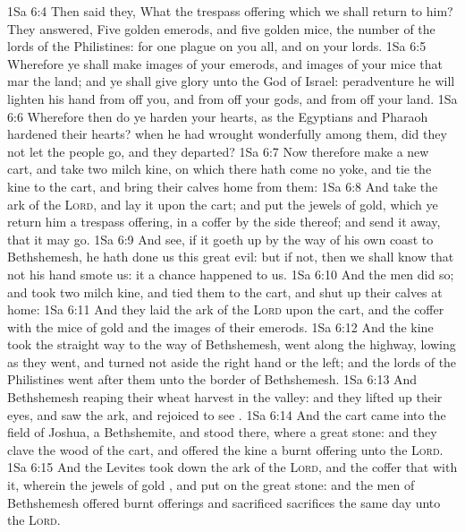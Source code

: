 \vs 1Sa 6:4 Then said they, What  the trespass offering which we shall return to him? They answered, Five golden emerods, and five golden mice,  the number of the lords of the Philistines: for one plague  on you all, and on your lords.
\vs 1Sa 6:5 Wherefore ye shall make images of your emerods, and images of your mice that mar the land; and ye shall give glory unto the God of Israel: peradventure he will lighten his hand from off you, and from off your gods, and from off your land.
\vs 1Sa 6:6 Wherefore then do ye harden your hearts, as the Egyptians and Pharaoh hardened their hearts? when he had wrought wonderfully among them, did they not let the people go, and they departed?
\vs 1Sa 6:7 Now therefore make a new cart, and take two milch kine, on which there hath come no yoke, and tie the kine to the cart, and bring their calves home from them:
\vs 1Sa 6:8 And take the ark of the \textsc{Lord}, and lay it upon the cart; and put the jewels of gold, which ye return him  a trespass offering, in a coffer by the side thereof; and send it away, that it may go.
\vs 1Sa 6:9 And see, if it goeth up by the way of his own coast to Bethshemesh,  he hath done us this great evil: but if not, then we shall know that  not his hand  smote us: it  a chance  happened to us.
\vs 1Sa 6:10 And the men did so; and took two milch kine, and tied them to the cart, and shut up their calves at home:
\vs 1Sa 6:11 And they laid the ark of the \textsc{Lord} upon the cart, and the coffer with the mice of gold and the images of their emerods.
\vs 1Sa 6:12 And the kine took the straight way to the way of Bethshemesh,  went along the highway, lowing as they went, and turned not aside  the right hand or  the left; and the lords of the Philistines went after them unto the border of Bethshemesh.
\vs 1Sa 6:13 And  Bethshemesh  reaping their wheat harvest in the valley: and they lifted up their eyes, and saw the ark, and rejoiced to see .
\vs 1Sa 6:14 And the cart came into the field of Joshua, a Bethshemite, and stood there, where  a great stone: and they clave the wood of the cart, and offered the kine a burnt offering unto the \textsc{Lord}.
\vs 1Sa 6:15 And the Levites took down the ark of the \textsc{Lord}, and the coffer that  with it, wherein the jewels of gold , and put  on the great stone: and the men of Bethshemesh offered burnt offerings and sacrificed sacrifices the same day unto the \textsc{Lord}.
